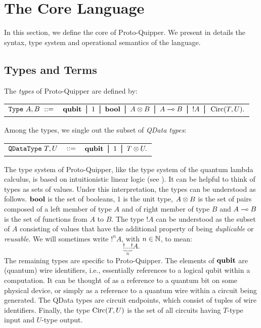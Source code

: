 \documentclass[twoside]{article}
\begin{document}
\clearpage
\section{The Core Language}

In this section, we define the core of Proto-Quipper. We 
present in details the syntax, type system and 
operational semantics of the language.

\subsection{Types and Terms}
\label{ssec-types-and-terms}

\begin{definition} 
The \emph{types} of Proto-Quipper are defined by:
\begin{center}
\begin{tabular}{rl}
$\texttt{Type}~A,B~::=$ & $ \qubit \bor 1 \bor \bool \bor A\tensor B \bor 
A\loli B \bor !A \bor \Circ (T,U).$\\
\end{tabular}
\end{center}
Among the types, we single out the subset of \emph{QData types}:
\begin{center}
\begin{tabular}{rcl}
$\texttt{QDataType}~T,U$ & $::=$ & $\qubit \bor 1 \bor T \tensor U.$
\end{tabular}
\end{center}
\end{definition}

The type system of Proto-Quipper, like the type system of the quantum lambda calculus, 
is based on intuitionistic linear logic (see \cite{Gir87}). 
It can be helpful to think of types as sets of values. Under this 
interpretation, the types can be understood as follows. $\textrm{\bf bool}$ is 
the set of booleans, $1$ is the unit type, $A\otimes B$ is the set of 
pairs composed of a left member of type $A$ and of right member 
of type $B$ and $A\multimap B$ is the set of functions from $A$ to 
$B$. The type $!A$ can be understood as the subset of $A$ 
consisting of values that have the additional property of being 
\emph{duplicable} or \emph{reusable}. We will sometimes write 
$!^nA$, with $n\in\mathbb{N}$, to mean: 
\[
\underbrace{!\ldots !}_{n} A.
\]
The remaining types are specific to Proto-Quipper. The elements 
of $\textrm{\bf qubit}$ are (quantum) wire identifiers, i.e., essentially 
references to a  logical qubit within a computation. It can be 
thought of as a reference to a quantum bit on some physical device, 
or simply as a  reference to a quantum wire within a circuit being 
generated. The QData types are circuit endpoints, which consist of 
tuples of wire identifiers. Finally, the type $\mathop{\textrm{Circ}}\nolimits(T,U)$ is the 
set of all circuits having $T$-type input and $U$-type output. 
\end{document}
